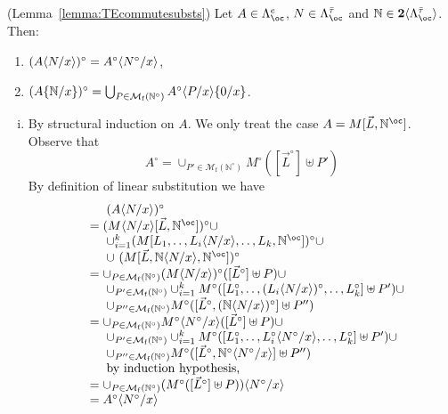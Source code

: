\documentclass{LMCS}
\newcommand{\bool}{\mathbf{2}}
\newcommand{\bang}{\oc}
\newcommand{\FSet}[1]{\Lambda^{#1}_{\bang}}
\newcommand{\Fsums}[1]{\bool\langle\FSet{#1}\rangle}
\newcommand{\subst}[2]{\{ #2 / #1 \}}	\newcommand{\dg}[2]{\mathrm{deg}_{#1}(#2)} \newcommand{\obsle}{\sqsubseteq_{\mathcal{O}}}
\newcommand{\TE}[1]{#1^{\circ}} \newcommand{\at}{\!::\!}
\newcommand{\Mfin}[1]{\mathcal{M}_{\mathrm{f}}(#1)}
\newcommand{\mcup}{\uplus}
\newcommand{\seq}[1]{\vec{#1}}
\newcommand{\sN}{\mathbb{N}}
\newcommand{\gto}{\ensuremath{\bar\tau}}
\newcommand{\pts}{.\,.\,}
\begin{document}
\begin{lem} (Lemma~\ref{lemma:TEcommutesubsts})
Let $A\in\FSet{e}$, $N\in\FSet{\gto}$ and $\sN\in\Fsums{\gto}$. Then:
\begin{enumerate}[\em(i)]
\item
	$\TE{(A\lsubst{x}{N})} = \TE{A}\lsubst{x}{\TE{N}}$,
\item
	$\TE{(A\subst{x}{\sN})} = \bigcup_{P\in\Mfin{\TE{\sN}}}\TE{A}\lsubst{x}{P}\subst{x}{0}$.
\end{enumerate}
\end{lem}

\proof\hfill
\begin{enumerate}[(i)]
\item  By structural induction on $A$.
We only treat the case $A = M[\seq L,\sN^\bang]$. Observe that
$$ \TE{A} = \cup_{P' \in \Mfin{\TE{\sN}}} \TE{M}([\TE{\seq {L}}] \mcup P') $$
By definition of linear substitution we have 
$$
\hspace{-2pt}\begin{array}{ll}
& \ \ \ \ \TE{(A\lsubst{x}{N})} \\
& = \TE{(M\lsubst{x}{N}[\seq L,\sN^\bang])} \cup \\
& \ \ \ \ \cup_{i=1}^{k} \TE{(M[L_1,\pts,L_i\lsubst{x}{N},\pts,L_k,\sN^\bang])} \cup \\
& \ \ \ \ \cup\ \TE{(M[\seq L,\sN\lsubst{x}{N},\sN^\bang])} \\
& = \cup_{P\in \Mfin{\TE{\sN}}} \TE{(M\lsubst{x}{N})}([\TE{\seq {L}}]\mcup P) \cup \\
& \ \ \ \ \cup_{P'\in \Mfin{\TE{\sN}}} \cup_{i=1}^{k} \TE{M}([\TE{L_1},\pts,\TE{(L_i\lsubst{x}{N})},\pts,\TE{L_k}] \mcup P') \cup \\
& \ \ \ \ \cup_{P''\in \Mfin{\TE{\sN}}} \TE{M}([\TE{\seq {L}},\TE{(\sN\lsubst{x}{N})}] \mcup P'') \\
& = \cup_{P\in \Mfin{\TE{\sN}}} \TE{M}\lsubst{x}{\TE{N}}([\TE{\seq {L}}] \mcup P) \cup \\
& \ \ \ \ \cup_{P'\in \Mfin{\TE{\sN}}} \cup_{i=1}^{k} \TE{M}([\TE{L_1},\pts,\TE{L_i}\lsubst{x}{\TE{N}},\pts,\TE{L_k}] \mcup P') \cup \\
& \ \ \ \ \cup_{P''\in \Mfin{\TE{\sN}}} \TE{M}([\TE{\seq {L}},\TE{\sN}\lsubst{x}{\TE{N}}]\mcup P'') \\
& \ \ \ \ \textrm{by induction hypothesis,} \\
& = \cup_{P\in \Mfin{\TE{\sN}}} (\TE{M}([\TE{\seq {L}}] \mcup P))\lsubst{x}{\TE{N}} \\
& = \TE{A}\lsubst{x}{\TE{N}} \\
\end{array}
$$


\end{enumerate}
\end{document}
